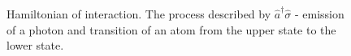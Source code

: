 \begin{figure}
\centering



\caption{Hamiltonian of interaction. The process described by $\hat{a}^{\dag}\hat{\sigma}$ - emission
  of a photon and transition of an atom from the upper state to the lower state.}
\label{figPart1Ch2_2_3}
\end{figure}